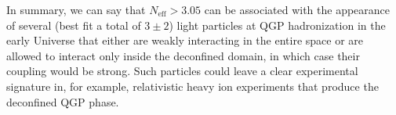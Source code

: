 In summary, we can say that   $N_{\text{eff}}>3.05$ can be associated  with the appearance of several  (best fit a total of $3\pm2$) light  particles at QGP hadronization in the early Universe that either are weakly interacting in the entire space or are allowed to interact only inside the deconfined domain, in which case their coupling would be strong. Such particles could leave a clear experimental signature in, for example, relativistic heavy ion experiments that produce the deconfined QGP phase.



